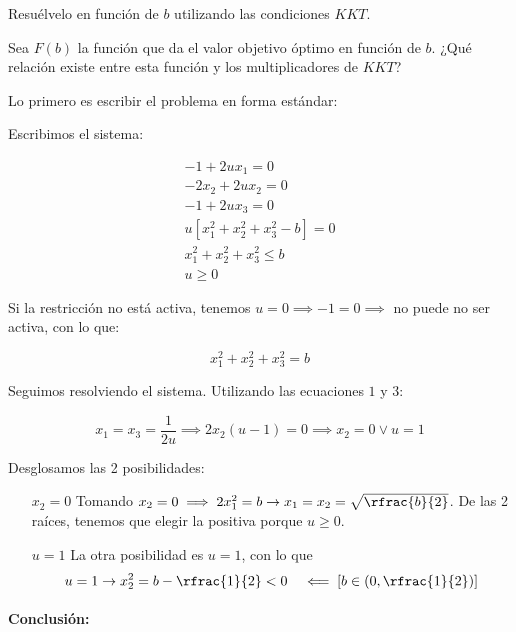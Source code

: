\begin{problem}[1]


\ppart Resuélvelo en función de $b$ utilizando las condiciones $KKT$.

\ppart Sea $F(b)$ la función que da el valor objetivo óptimo en función de $b$. ¿Qué relación existe entre esta función y los multiplicadores de $KKT$?


\solution

Lo primero es escribir el problema en forma estándar:
\begin{ioprob}
\end{ioprob}

\spart Escribimos el sistema:

\[
	\begin{array}{r}
		-1+2ux_1 = 0\\
		-2x_2+2ux_2 = 0\\
		-1+2ux_3 = 0\\
		u[x_1^2+x_2^2+x_3^2-b] = 0\\
		x_1^2+x_2^2+x_3^2≤b\\
		u≥0
	\end{array}
\]

Si la restricción no está activa, tenemos $u=0 \implies -1 = 0 \implies $ no puede no ser activa, con lo que:

\[x_1^2+x_2^2+x_3^2 = b\]


Seguimos resolviendo el sistema. Utilizando las ecuaciones $1$ y $3$:

\[
	x_1 = x_3 = \frac{1}{2u} \implies 2x_2(u-1) = 0 \implies x_2 = 0 \vee u = 1
\]

Desglosamos las 2 posibilidades:

\begin{itemize}
	\item[$x_2=0$] Tomando $x_2 = 0 \implies 2x_1^2 = b \to x_1=x_2=\sqrt{\rfrac{b}{2}}$. De las 2 raíces, tenemos que elegir la positiva porque $u≥0$.

	\item[$u=1$] La otra posibilidad es $u=1$, con lo que 
	\[
		u=1\to x^2_2=b-\rfrac{1}{2} < 0 \;\;\; \impliedby \left[b\in\left(0,\rfrac{1}{2}\right)\right]
	\]
\end{itemize}

\paragraph{Conclusión:} 


\end{problem}
